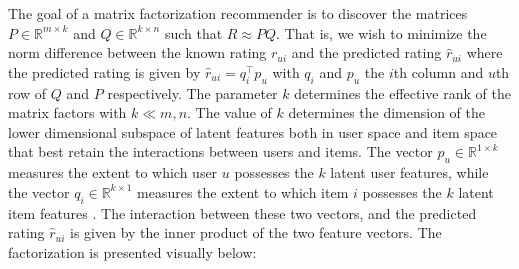 \documentclass{article} %
\begin{document}
The goal of a matrix factorization recommender is to discover the matrices $P \in \mathbb{R}^{m \times k}$ and $Q \in \mathbb{R}^{k \times n}$ such that $R \approx PQ$. That is, we wish to minimize the norm difference between the known rating $r_{ui}$ and the predicted rating $\hat r_{ui}$ where the predicted rating is given by $\hat r_{ui} = q_i^\intercal p_u$ with $q_i$ and $p_u$ the $i$th column and $u$th row of $Q$ and $P$ respectively. The parameter $k$ determines the effective rank of the matrix factors with $k \ll m,n$. The value of $k$ determines the dimension of the lower dimensional subspace of latent features both in user space and item space that best retain the interactions between users and items. The vector $p_u \in \mathbb{R}^{1 \times k}$ measures the extent to which user $u$ possesses the $k$ latent user features, while the vector $q_i \in \mathbb{R}^{k \times 1}$ measures the extent to which item $i$ possesses the $k$ latent item features \cite{ATTPaper2009}. The interaction between these two vectors, and the predicted rating $\hat r_{ui}$ is given by the inner product of the two feature vectors. The factorization is presented visually below:
\end{document}
